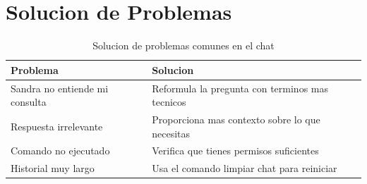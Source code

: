 \section{Solucion de Problemas}
\label{sec:solucion-problemas-chat}

\begin{table}[H]
\centering
\begin{tabular}{p{5cm}p{7cm}}
\toprule
\textbf{Problema} & \textbf{Solucion} \\
\midrule
Sandra no entiende mi consulta & Reformula la pregunta con terminos mas tecnicos \\
\midrule
Respuesta irrelevante & Proporciona mas contexto sobre lo que necesitas \\
\midrule
Comando no ejecutado & Verifica que tienes permisos suficientes \\
\midrule
Historial muy largo & Usa el comando limpiar chat para reiniciar \\
\bottomrule
\end{tabular}
\caption{Solucion de problemas comunes en el chat}
\label{tab:problemas-chat}
\end{table}
